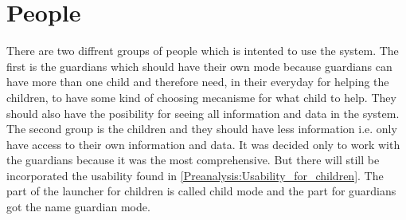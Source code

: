 \section{People}
\label{understanding:people}

There are two diffrent groups of people which is intented to use the \giraf[] system. The first is the guardians which should have their own mode because guardians can have more than one child and therefore need, in their everyday for helping the children, to have some kind of choosing mecanisme for what child to help. They should also have the posibility for seeing all information and data in the system. The second group is the children and they should have less information i.e. only have access to their own information and data.
It was decided only to work with the guardians because it was the most comprehensive. But there will still be incorporated the usability found in \autoref{Preanalysis:Usability_for_children}.
The part of the launcher for children is called child mode and the part for guardians got the name guardian mode.